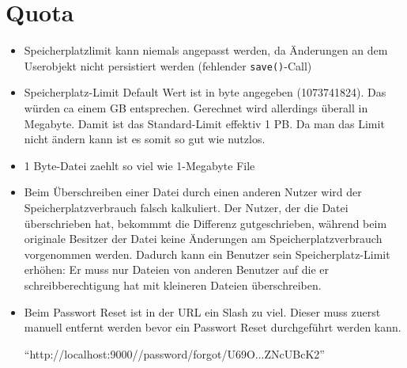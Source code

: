 \documentclass[12pt,DIV14,BCOR10mm,a4paper,parskip=half-,headsepline,headinclude,english,ngerman,bibliography=totocnumbered]{scrreprt}
\begin{document}
\section{Quota}

\begin{itemize}
 \item Speicherplatzlimit kann niemals angepasst werden, da Änderungen an dem Userobjekt nicht persistiert werden (fehlender \texttt{save()}-Call)
  \item Speicherplatz-Limit Default Wert ist in byte angegeben (1073741824). Das würden ca einem GB entsprechen. Gerechnet wird allerdings überall in Megabyte. Damit ist das Standard-Limit effektiv 1 PB. Da man das Limit nicht ändern kann ist es somit so gut wie nutzlos.
  \item 1 Byte-Datei zaehlt so viel wie 1-Megabyte File
  \item Beim Überschreiben einer Datei durch einen anderen Nutzer wird der Speicherplatzverbrauch falsch kalkuliert. Der Nutzer, der die Datei überschrieben hat, bekommmt die Differenz gutgeschrieben, während beim originale Besitzer der Datei keine Änderungen am Speicherplatzverbrauch vorgenommen werden. Dadurch kann ein Benutzer sein Speicherplatz-Limit erhöhen: Er muss nur Dateien von anderen Benutzer auf die er schreibberechtigung hat mit kleineren Dateien überschreiben.
  \item Beim Passwort Reset ist in der URL ein Slash zu viel. Dieser muss zuerst manuell entfernt werden bevor ein Passwort Reset durchgeführt werden kann.
  
  \enquote{http://localhost:9000//password/forgot/U69O...ZNcUBcK2}
  \end{itemize}
\end{document}
